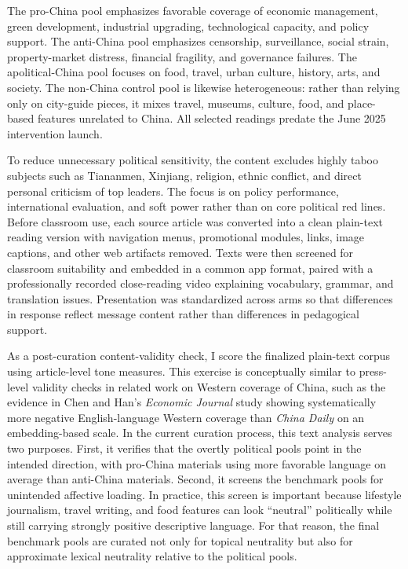 \documentclass[12pt,american]{article}
\begin{document}
The pro-China pool emphasizes favorable coverage of economic management, green development, industrial upgrading, technological capacity, and policy support. The anti-China pool emphasizes censorship, surveillance, social strain, property-market distress, financial fragility, and governance failures. The apolitical-China pool focuses on food, travel, urban culture, history, arts, and society. The non-China control pool is likewise heterogeneous: rather than relying only on city-guide pieces, it mixes travel, museums, culture, food, and place-based features unrelated to China. All selected readings predate the June 2025 intervention launch.

To reduce unnecessary political sensitivity, the content excludes highly taboo subjects such as Tiananmen, Xinjiang, religion, ethnic conflict, and direct personal criticism of top leaders. The focus is on policy performance, international evaluation, and soft power rather than on core political red lines. Before classroom use, each source article was converted into a clean plain-text reading version with navigation menus, promotional modules, links, image captions, and other web artifacts removed. Texts were then screened for classroom suitability and embedded in a common app format, paired with a professionally recorded close-reading video explaining vocabulary, grammar, and translation issues. Presentation was standardized across arms so that differences in response reflect message content rather than differences in pedagogical support.

As a post-curation content-validity check, I score the finalized plain-text corpus using article-level tone measures. This exercise is conceptually similar to press-level validity checks in related work on Western coverage of China, such as the evidence in Chen and Han's \emph{Economic Journal} study showing systematically more negative English-language Western coverage than \emph{China Daily} on an embedding-based scale. In the current curation process, this text analysis serves two purposes. First, it verifies that the overtly political pools point in the intended direction, with pro-China materials using more favorable language on average than anti-China materials. Second, it screens the benchmark pools for unintended affective loading. In practice, this screen is important because lifestyle journalism, travel writing, and food features can look ``neutral'' politically while still carrying strongly positive descriptive language. For that reason, the final benchmark pools are curated not only for topical neutrality but also for approximate lexical neutrality relative to the political pools.
\end{document}
